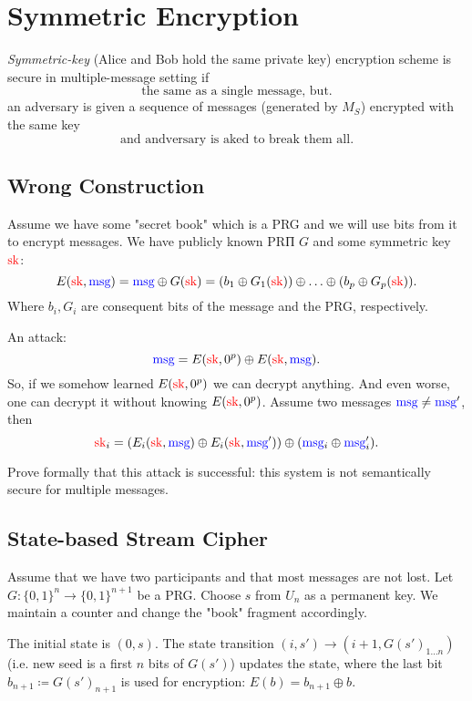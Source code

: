 

\section{Symmetric Encryption}


\begin{definition}
	\emph{Symmetric-key} (Alice and Bob hold the same private key) encryption scheme is secure in multiple-message setting if
	\[
		\text{the same as a single message, but}
	.\] an adversary is given a sequence of messages (generated by $M_S$) encrypted with the same key
	\[
		\text{and andversary is aked to break them all}
	.\] 
\end{definition}

\subsection{Wrong Construction}

Assume we have some "secret book" which is a PRG and we will use bits from it to encrypt messages.
We have publicly known PRП $G$ and some symmetric key  $\textcolor{red}{\text{sk}}$:
 \[
E(\textcolor{red}{\text{sk}}, \textcolor{blue}{\text{msg}}) = \textcolor{blue}{\text{msg}} \oplus G(\textcolor{red}{\text{sk}}) = (b_1 \oplus G_1(\textcolor{red}{\text{sk}})) \oplus \ldots \oplus (b_p \oplus G_p(\textcolor{red}{\text{sk}}))
.\] 
Where $b_i, G_i$ are consequent bits of the message and the PRG, respectively.

An attack:
 \[
	 \textcolor{blue}{\text{msg}} = E(\textcolor{red}{\text{sk}}, 0^{p}) \oplus E(\textcolor{red}{\text{sk}}, \textcolor{blue}{\text{msg}})
.\] 
So, if we somehow learned $E(\textcolor{red}{\text{sk}}, 0^{p})$ we can decrypt anything.
And even worse, one can decrypt it without knowing $E(\textcolor{red}{\text{sk}}, 0^{p})$.
Assume two messages $\textcolor{blue}{\text{msg}} \neq \textcolor{blue}{\text{msg}}'$, then
\[
\textcolor{red}{\text{sk}}_i = (E_i(\textcolor{red}{\text{sk}}, \textcolor{blue}{\text{msg}}) \oplus E_i(\textcolor{red}{\text{sk}}, \textcolor{blue}{\text{msg}}')) \oplus (\textcolor{blue}{\text{msg}}_i \oplus \textcolor{blue}{\text{msg}}'_i)
.\] 
\begin{exercise}
	Prove formally that this attack is successful: this system is not semantically secure for multiple messages.
\end{exercise}

\subsection{State-based Stream Cipher}

Assume that we have two participants and that most messages are not lost.
Let $G \colon \{0, 1\}^{n} \to  \{0, 1\}^{n + 1}$ be a PRG.
Choose $s$ from $U_n$ as a permanent key.
We maintain a counter and change the "book" fragment accordingly.

The initial state is $(0, s)$.
The state transition $(i, s') \to (i + 1, G(s')_{1\ldots n})$ (i.e. new seed is a first  $n$ bits of  $G(s')$) updates the state, where the last bit $b_{n + 1} \coloneqq G(s')_{n + 1}$ is used for encryption: $E(b) = b_{n + 1} \oplus b$.

